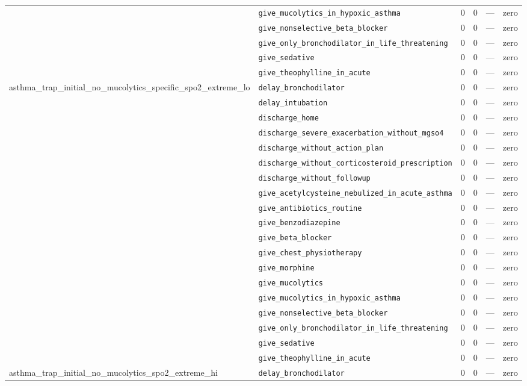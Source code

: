 \begin{table}[ht]
\begin{tabular}{llrrrl}
 & \texttt{give\_mucolytics\_in\_hypoxic\_asthma} & 0 & 0 & — & zero \\
 & \texttt{give\_nonselective\_beta\_blocker} & 0 & 0 & — & zero \\
 & \texttt{give\_only\_bronchodilator\_in\_life\_threatening} & 0 & 0 & — & zero \\
 & \texttt{give\_sedative} & 0 & 0 & — & zero \\
 & \texttt{give\_theophylline\_in\_acute} & 0 & 0 & — & zero \\
\midrule
asthma\_trap\_initial\_no\_mucolytics\_specific\_spo2\_extreme\_lo & \texttt{delay\_bronchodilator} & 0 & 0 & — & zero \\
 & \texttt{delay\_intubation} & 0 & 0 & — & zero \\
 & \texttt{discharge\_home} & 0 & 0 & — & zero \\
 & \texttt{discharge\_severe\_exacerbation\_without\_mgso4} & 0 & 0 & — & zero \\
 & \texttt{discharge\_without\_action\_plan} & 0 & 0 & — & zero \\
 & \texttt{discharge\_without\_corticosteroid\_prescription} & 0 & 0 & — & zero \\
 & \texttt{discharge\_without\_followup} & 0 & 0 & — & zero \\
 & \texttt{give\_acetylcysteine\_nebulized\_in\_acute\_asthma} & 0 & 0 & — & zero \\
 & \texttt{give\_antibiotics\_routine} & 0 & 0 & — & zero \\
 & \texttt{give\_benzodiazepine} & 0 & 0 & — & zero \\
 & \texttt{give\_beta\_blocker} & 0 & 0 & — & zero \\
 & \texttt{give\_chest\_physiotherapy} & 0 & 0 & — & zero \\
 & \texttt{give\_morphine} & 0 & 0 & — & zero \\
 & \texttt{give\_mucolytics} & 0 & 0 & — & zero \\
 & \texttt{give\_mucolytics\_in\_hypoxic\_asthma} & 0 & 0 & — & zero \\
 & \texttt{give\_nonselective\_beta\_blocker} & 0 & 0 & — & zero \\
 & \texttt{give\_only\_bronchodilator\_in\_life\_threatening} & 0 & 0 & — & zero \\
 & \texttt{give\_sedative} & 0 & 0 & — & zero \\
 & \texttt{give\_theophylline\_in\_acute} & 0 & 0 & — & zero \\
\midrule
asthma\_trap\_initial\_no\_mucolytics\_spo2\_extreme\_hi & \texttt{delay\_bronchodilator} & 0 & 0 & — & zero \\

\end{tabular}
\end{table}
